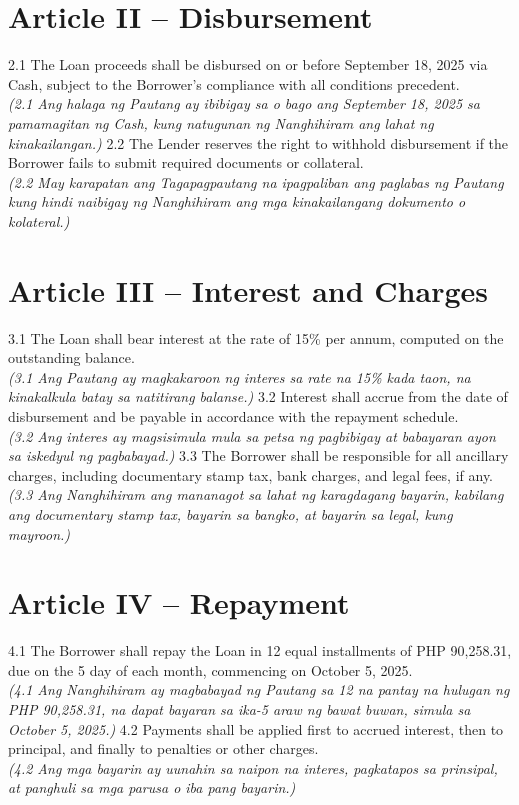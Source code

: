 \documentclass[a4paper,12pt]{article}
\begin{document}
\section*{Article II – Disbursement}
2.1 The Loan proceeds shall be disbursed on or before September 18, 2025 via Cash, subject to the Borrower’s compliance with all conditions precedent. \\
\textit{(2.1 Ang halaga ng Pautang ay ibibigay sa o bago ang September 18, 2025 sa pamamagitan ng Cash, kung natugunan ng Nanghihiram ang lahat ng kinakailangan.)}
2.2 The Lender reserves the right to withhold disbursement if the Borrower fails to submit required documents or collateral. \\
\textit{(2.2 May karapatan ang Tagapagpautang na ipagpaliban ang paglabas ng Pautang kung hindi naibigay ng Nanghihiram ang mga kinakailangang dokumento o kolateral.)}
\section*{Article III – Interest and Charges}
3.1 The Loan shall bear interest at the rate of 15\% per annum, computed on the outstanding balance. \\
\textit{(3.1 Ang Pautang ay magkakaroon ng interes sa rate na 15\% kada taon, na kinakalkula batay sa natitirang balanse.)}
3.2 Interest shall accrue from the date of disbursement and be payable in accordance with the repayment schedule. \\
\textit{(3.2 Ang interes ay magsisimula mula sa petsa ng pagbibigay at babayaran ayon sa iskedyul ng pagbabayad.)}
3.3 The Borrower shall be responsible for all ancillary charges, including documentary stamp tax, bank charges, and legal fees, if any. \\
\textit{(3.3 Ang Nanghihiram ang mananagot sa lahat ng karagdagang bayarin, kabilang ang documentary stamp tax, bayarin sa bangko, at bayarin sa legal, kung mayroon.)}
\section*{Article IV – Repayment}
4.1 The Borrower shall repay the Loan in 12 equal installments of PHP 90,258.31, due on the 5 day of each month, commencing on October 5, 2025. \\
\textit{(4.1 Ang Nanghihiram ay magbabayad ng Pautang sa 12 na pantay na hulugan ng PHP 90,258.31, na dapat bayaran sa ika-5 araw ng bawat buwan, simula sa October 5, 2025.)}
4.2 Payments shall be applied first to accrued interest, then to principal, and finally to penalties or other charges. \\
\textit{(4.2 Ang mga bayarin ay uunahin sa naipon na interes, pagkatapos sa prinsipal, at panghuli sa mga parusa o iba pang bayarin.)}
\end{document}
